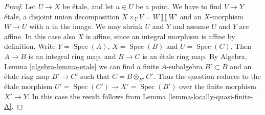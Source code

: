 \documentclass[10pt,a4paper]{amsart}
\theoremstyle{plain}
\theoremstyle{definition}
\theoremstyle{remark}
\numberwithin{equation}{subsection}
\def\Spec{\mathop{\mathrm{Spec}}}
\begin{document}
\begin{proof}
Let $U \to X$ be \'etale, and let $u \in U$ be a point.
We have to find $V \to Y$ \'etale, a disjoint union decomposition
$X \times_Y V = W \amalg W'$ and an $X$-morphism $W \to U$
with $u$ in the image. We may shrink $U$ and $Y$ and assume
$U$ and $Y$ are affine. In this case also $X$ is affine, since
an integral morphism is affine by definition. Write $Y = \Spec(A)$,
$X = \Spec(B)$ and $U = \Spec(C)$. Then $A \to B$ is an
integral ring map, and $B \to C$ is an \'etale ring map. By
Algebra, Lemma \ref{algebra-lemma-etale}
we can find a finite $A$-subalgebra $B' \subset B$ and an \'etale ring
map $B' \to C'$ such that $C = B \otimes_{B'} C'$. Thus the question
reduces to the \'etale morphism
$U' = \Spec(C') \to X' = \Spec(B')$
over the finite morphism $X' \to Y$. In this case the result follows from
Lemma \ref{lemma-locally-quasi-finite-A}.
\end{proof}
\end{document}
